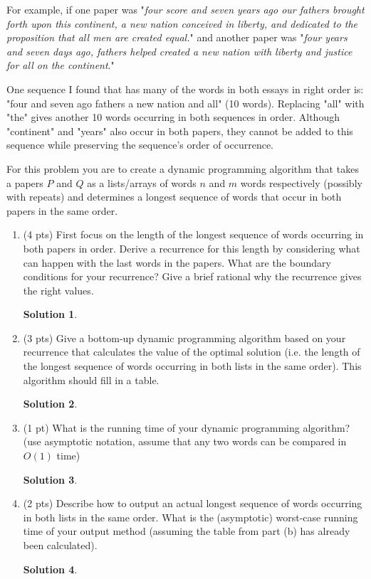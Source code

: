 \documentclass[11pt]{article}
\newtheorem*{solution}{Solution}
\begin{document}
\begin{enumerate}
For example, if one paper was "\emph{four score and seven years ago our fathers brought forth upon this continent, a new nation conceived in liberty, and dedicated to the proposition that all men are created equal.}"  and another paper was "\emph{four years and seven days ago, fathers helped created a new nation with liberty and justice for all on the continent}."

One sequence I found that has many of the words in both essays in right order is:
"four and seven ago fathers a new nation and all" (10 words).  Replacing "all" with "the" gives another 10 words occurring in both sequences in order.
Although "continent" and "years" also occur in both papers, they cannot be added to this sequence while preserving the sequence's order of occurrence. 

For this problem you are to create a dynamic programming algorithm that takes a papers $P$ and $Q$ as a lists/arrays of words $n$ and $m$ words respectively (possibly with repeats) and determines a longest sequence of words that occur in both papers in the same order.
\newpage
\begin{enumerate}
\item (4 pts) First focus on the length of the longest sequence of words occurring in both papers in order.
Derive a recurrence for this length by considering what can happen with the last words in the papers.
What are the boundary conditions for your recurrence?
Give a brief rational why the recurrence gives the right values.

\begin{solution}

\end{solution}
\newpage
\item (3 pts) Give a bottom-up dynamic programming algorithm based on your recurrence that calculates the value of the optimal solution (i.e. the length of the longest sequence of words occurring in both lists in the same order).   This algorithm should fill in a table.
\begin{solution}

\end{solution}
\newpage

\item (1 pt) What is the running time of your dynamic programming algorithm? (use asymptotic notation, assume that any two words can be compared in $O(1)$ time)
\begin{solution}

\end{solution}
\newpage

\item (2 pts) Describe how to output an actual longest sequence of words occurring in both lists in the same order.
What is the (asymptotic) worst-case running time of your output method (assuming the table from part (b) has already been calculated).
\begin{solution}

\end{solution}
\end{enumerate}  


\end{enumerate} 
\end{document}

